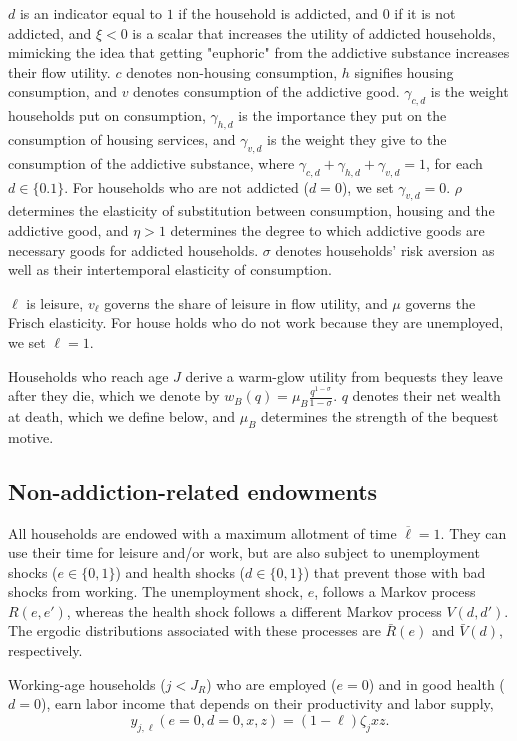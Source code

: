 \documentclass[parskip=full]{article}
\begin{document}
\noindent $d$ is an indicator equal to $1$ if the household is addicted, and $0$ if it is not addicted, and $\xi<0$ is a scalar that increases the utility of addicted households, mimicking the idea that getting "euphoric" from the addictive
substance increases their flow utility. $c$ denotes non-housing consumption, $h$ signifies housing consumption, and $v$ denotes consumption of the addictive good. $\gamma_{c,d}$ is the weight households put on consumption, $\gamma_{h,d}$ is the importance they put on the consumption of housing services, and $\gamma_{v,d}$ is the weight they give to the consumption of the addictive substance, where $\gamma_{c,d} + \gamma_{h,d} + \gamma_{v,d} = 1$, for each $d \in \{0.1\}$. For households who are not addicted ($d=0$), we set $\gamma_{v,d}=0$. $\rho$ determines the elasticity of substitution between consumption, housing and the addictive good, and $\eta>1$ determines the degree to which addictive goods are necessary goods for addicted households. $\sigma$ denotes  households’ risk aversion as well as their intertemporal elasticity of consumption.

$\ell$ is leisure, $v_{\ell}$ governs the share of leisure in flow utility, and $\mu$ governs the Frisch elasticity. For house holds who do not work because they are unemployed, we set $\ell=1$.

Households who reach age $J$ derive a warm-glow utility from bequests they leave after they die, which we denote by $w_B(q)=\mu_{B} \frac{q^{1-\sigma}}{1-\sigma}$. $q$ denotes their net wealth at death, which we define below, and $\mu_{B}$ determines the strength of the bequest motive.

\subsection{Non-addiction-related endowments}\label{sec:non_addiction_endowments}
All households are endowed with a maximum allotment of time $\overline{\ell}=1$. They can use their time for leisure and/or work, but are also subject to unemployment shocks ($e \in \{0,1\}$) and health shocks ($d \in \{0,1\}$) that prevent those with bad shocks from working. The unemployment shock, $e$, follows a Markov process $R(e,e')$, whereas the health shock follows a different Markov process $V(d,d')$. The ergodic distributions associated with these processes are $\bar{R}(e)$ and $\bar{V}(d)$, respectively.

Working-age households ($j<J_R$) who are employed ($e=0$) and in good health ($d=0$), earn labor income that depends on their productivity and labor supply,
\begin{equation}
y_{j,\ell}(e=0,d=0,x,z) = (1-\ell) \zeta_j x z.
\end{equation}
\end{document}

